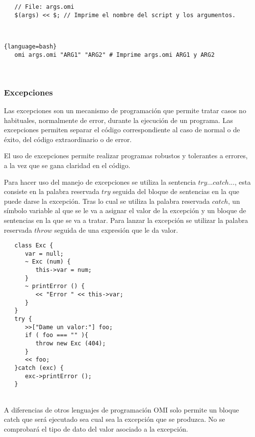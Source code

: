  \begin{lstlisting}
   // File: args.omi
   $(args) << $; // Imprime el nombre del script y los argumentos.
\end{lstlisting}
\hfill\\ 

 \begin{lstlisting}{language=bash}
   omi args.omi "ARG1" "ARG2" # Imprime args.omi ARG1 y ARG2
\end{lstlisting}
\hfill\\ 

\subsubsection{Excepciones} \label{sec:exception}

Las excepciones son un mecanismo de programación que permite tratar casos no habituales, normalmente de error, durante la ejecución de un programa. Las excepciones
permiten separar el código correspondiente al caso de normal o de éxito, del código extraordinario o de error. 

El uso de excepciones permite realizar programas robustos y tolerantes a errores, a la vez que se gana claridad en el código.

Para hacer uso del manejo de excepciones se utiliza la sentencia $try...catch...$, esta consiste en la palabra reservada $try$ seguida del bloque de 
sentencias en la que puede darse la excepción. Tras lo cual se utiliza la palabra reservada $catch$, un símbolo variable al que se le va a asignar el valor de la excepción y un bloque de 
sentencias en la que se va a tratar. Para lanzar la excepción se utilizar la palabra reservada $throw$ seguida de una expresión que le da valor. \\

\begin{lstlisting}
   class Exc {
      var = null;
      ~ Exc (num) {
         this->var = num;
      }
      ~ printError () {
         << "Error " << this->var;
      }
   }
   try {
      >>["Dame un valor:"] foo;
      if ( foo === "" ){
         throw new Exc (404);
      } 
      << foo;
   }catch (exc) {
      exc->printError ();
   }
\end{lstlisting}
\hfill\\ 

A diferencias de otros lenguajes de programación OMI solo permite un bloque catch que será ejecutado sea cual sea la excepción que se produzca. No se comprobará el 
tipo de dato del valor asociado a la excepción. 

